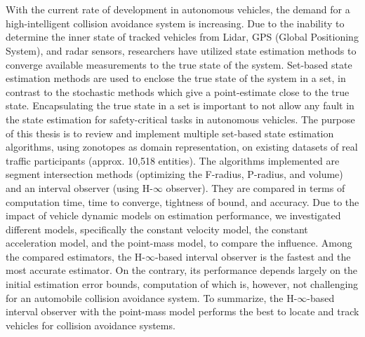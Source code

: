 \chapter{\abstractname}
With the current rate of development in autonomous vehicles, the demand for a high-intelligent collision avoidance system is increasing. Due to the inability to determine the inner state of tracked vehicles from Lidar, GPS (Global Positioning System), and radar sensors, researchers have utilized state estimation methods to converge available measurements to the true state of the system. Set-based state estimation methods are used to enclose the true state of the system in a set, in contrast to the stochastic methods which give a point-estimate close to the true state. Encapsulating the true state in a set is important to not allow any fault in the state estimation for safety-critical tasks in autonomous vehicles. The purpose of this thesis is to review and implement multiple set-based state estimation algorithms, using zonotopes as domain representation, on existing datasets of real traffic participants (approx. 10,518 entities). The algorithms implemented are segment intersection methods (optimizing the F-radius, P-radius, and volume) and an interval observer (using H-$\infty$ observer). They are compared in terms of computation time, time to converge, tightness of bound, and accuracy. Due to the impact of vehicle dynamic models on estimation performance, we investigated different models, specifically the constant velocity model, the constant acceleration model, and the point-mass model, to compare the influence. Among the compared estimators, the H-$\infty$-based interval observer is the fastest and the most accurate estimator. On the contrary, its performance depends largely on the initial estimation error bounds, computation of which is, however, not challenging for an automobile collision avoidance system. To summarize, the H-$\infty$-based interval observer with the point-mass model performs the best to locate and track vehicles for collision avoidance systems.